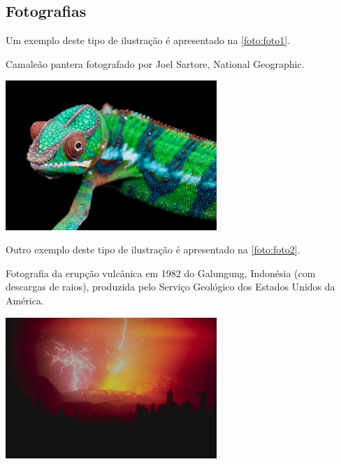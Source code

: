 \subsection{Fotografias}\label{sec:fotografias}

Um exemplo deste tipo de ilustração é apresentado na \autoref{foto:foto1}.

\begin{photograph}[htb]%
\captionsetup{width=0.6\textwidth}%
\caption{Camaleão pantera fotografado por Joel Sartore, National Geographic.}%
\label{foto:foto1}%
\includegraphics[width=0.6\textwidth]{./CapituloExemplo/foto1}%
\end{photograph}

Outro exemplo deste tipo de ilustração é apresentado na \autoref{foto:foto2}.

\begin{photograph}[htb]%
\captionsetup{width=0.6\textwidth}%
\caption{Fotografia da erupção vulcânica em 1982 do Galungung, Indonésia (com descargas de raios), produzida pelo Serviço Geológico dos Estados Unidos da América.}%
\label{foto:foto2}%
\includegraphics[width=0.6\textwidth]{./CapituloExemplo/foto2}%
\end{photograph}

